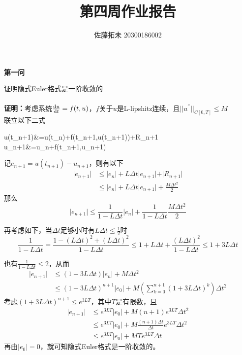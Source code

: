\documentclass[12pt]{article}
\title{第四周作业报告}
\author{佐藤拓未 20300186002}
\date{}
\begin{document}
	\maketitle
	\begin{center}
		\textbf{第一问}
	\end{center}
证明隐式Euler格式是一阶收敛的\\
\\
\noindent \textbf{证明：}考虑系统$\frac{{\rm d}u}{{\rm d}t}=f(t,u)$，$f$关于$u$是L-lipshitz连续，且$\vert\vert u^{''}\vert\vert_{C[0,T]}\le M$\\
联立以下二式

\begin{center}
		\begin{cases}
			u(t_{n+1})&=u(t_n)+f(t_{n+1},u(t_{n+1}))+R_{n+1}\\
			u_{n+1}&=u_n+f(t_{n+1},u_{n+1})
		\end{cases}
\end{center}
\noindent 记$e_{n+1}=u(t_{n+1})-u_{n+1}$，则有以下
\begin{align*}
	\vert e_{n+1}\vert&\le\vert e_n\vert + L\Delta{t}\vert e_{n+1}\vert + \vert R_{n+1}\vert\\
	&\le \vert e_n\vert + L\Delta{t}\vert e_{n+1}\vert +  \frac{M\Delta{t}^2}{2}
\end{align*}
那么
$$\vert e_{n+1}\vert \le \frac{1}{1-L\Delta{t}}\vert e_n\vert+\frac{1}{1-L\Delta{t}}\frac{M\Delta{t}^2}{2}$$

\noindent 再考虑如下，当$\Delta{t}$足够小时有$L\Delta{t}\le \frac{1}{2}$时
$$\frac{1}{1-L\Delta{t}}=\frac{1-(L\Delta{t})^2+(L\Delta{t})^2}{1-L\Delta{t}}\le1+L\Delta{t}+\frac{(L\Delta{t})^2}{1-L\Delta{t}}\le 1+ 3L\Delta{t}$$



\noindent 也有$\frac{1}{1-L\Delta{t}}\le2$，从而
\begin{align*}
	\vert e_{n+1}\vert&\le(1+3L\Delta{t})\vert e_n\vert+M\Delta{t}^2\\
	&\le(1+3L\Delta{t})^{n+1}\vert e_0\vert+M(\sum_{k=0}^{n+1}(1+3L\Delta{t})^k)\Delta{t}^2
\end{align*}
考虑$(1+3L\Delta{t})^{n+1}\le e^{3LT}$，其中$T$是有限数，且
\begin{align*}
	\vert e_{n+1}\vert &\le e^{3LT}\vert e_0\vert +M(n+1)e^{3LT}\Delta{t}^2\\
	&\le e^{3LT}\vert e_0\vert + M\frac{(n+1)\Delta{t}}{\Delta{t}}e^{3LT}\Delta{t}^2\\
	&\le e^{3LT}\vert e_0\vert + MTe^{3LT}\Delta{t}
\end{align*}
\noindent 再由$\vert e_0\vert =0$，就可知隐式Euler格式是一阶收敛的。\\
\end{document}
